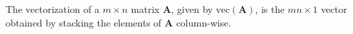 The vectorization of a 
$
m \times n
$
matrix
$
\mathbf{A}
$,
given by
$
\mathrm{vec}
\left(
\mathbf{A}
\right)
$,
is the
$
mn \times 1
$
vector obtained by stacking the elements of
$
\mathbf{A}
$
column-wise.